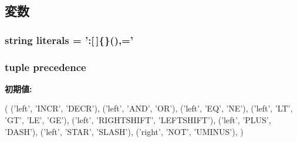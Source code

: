 \begin{DoxyVerb}
\subsection{変数}
\hypertarget{classslicc_1_1parser_1_1SLICC_a8ef3db3a5273b76c536881adb1ddeb63}{
\subsubsection[{base\_\-dir}]{}}
\label{classslicc_1_1parser_1_1SLICC_a8ef3db3a5273b76c536881adb1ddeb63}
\hypertarget{classslicc_1_1parser_1_1SLICC_a31dd93decfe243172100549e820d95f6}{
\subsubsection[{decl\_\-list}]{}}
\label{classslicc_1_1parser_1_1SLICC_a31dd93decfe243172100549e820d95f6}
\hypertarget{classslicc_1_1parser_1_1SLICC_aa9474c45230cc66b111ef5a167f116e3}{
\subsubsection[{literals}]{\setlength{\rightskip}{0pt plus 5cm}string {\bf literals} = ':\mbox{[}$\,$\mbox{]}\{\}(),='}}
\label{classslicc_1_1parser_1_1SLICC_aa9474c45230cc66b111ef5a167f116e3}
\hypertarget{classslicc_1_1parser_1_1SLICC_ae629291654f5986108ec12fd0f4938fa}{
\subsubsection[{precedence}]{\setlength{\rightskip}{0pt plus 5cm}tuple {\bf precedence}}}
\label{classslicc_1_1parser_1_1SLICC_ae629291654f5986108ec12fd0f4938fa}
{\bfseries 初期値:}
\begin{DoxyCode}
(
        ('left', 'INCR', 'DECR'),
        ('left', 'AND', 'OR'),
        ('left', 'EQ', 'NE'),
        ('left', 'LT', 'GT', 'LE', 'GE'),
        ('left', 'RIGHTSHIFT', 'LEFTSHIFT'),
        ('left', 'PLUS', 'DASH'),
        ('left', 'STAR', 'SLASH'),
        ('right', 'NOT', 'UMINUS'),
    )
\end{DoxyCode}
\hypertarget{classslicc_1_1parser_1_1SLICC_add2ec924c0f221790d7235ffb2e615cd}{
}
\end{DoxyVerb}
